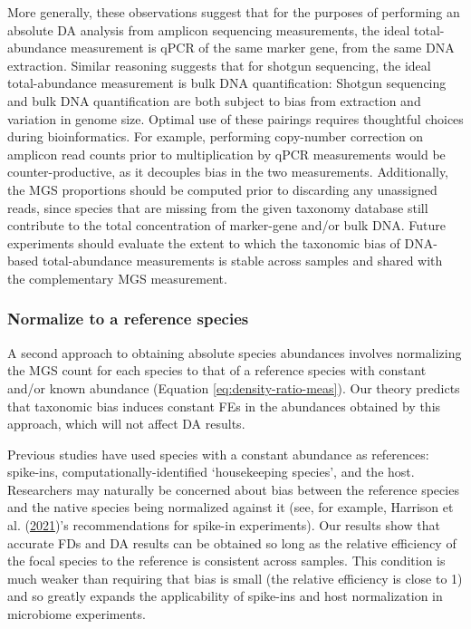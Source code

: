 \documentclass[
]{article}
\begin{document}
More generally, these observations suggest that for the purposes of performing an absolute DA analysis from amplicon sequencing measurements, the ideal total-abundance measurement is qPCR of the same marker gene, from the same DNA extraction.
Similar reasoning suggests that for shotgun sequencing, the ideal total-abundance measurement is bulk DNA quantification: Shotgun sequencing and bulk DNA quantification are both subject to bias from extraction and variation in genome size.
Optimal use of these pairings requires thoughtful choices during bioinformatics. For example, performing copy-number correction on amplicon read counts prior to multiplication by qPCR measurements would be counter-productive, as it decouples bias in the two measurements. Additionally, the MGS proportions should be computed prior to discarding any unassigned reads, since species that are missing from the given taxonomy database still contribute to the total concentration of marker-gene and/or bulk DNA.
Future experiments should evaluate the extent to which the taxonomic bias of DNA-based total-abundance measurements is stable across samples and shared with the complementary MGS measurement.

\hypertarget{normalize-to-a-reference-species}{%
\subsubsection{Normalize to a reference species}\label{normalize-to-a-reference-species}}

A second approach to obtaining absolute species abundances involves normalizing the MGS count for each species to that of a reference species with constant and/or known abundance (Equation \eqref{eq:density-ratio-meas}).
Our theory predicts that taxonomic bias induces constant FEs in the abundances obtained by this approach, which will not affect DA results.

Previous studies have used species with a constant abundance as references: spike-ins, computationally-identified `housekeeping species', and the host.
Researchers may naturally be concerned about bias between the reference species and the native species being normalized against it (see, for example, Harrison et al. (\protect\hyperlink{ref-harrison2021theq}{2021})'s recommendations for spike-in experiments).
Our results show that accurate FDs and DA results can be obtained so long as the relative efficiency of the focal species to the reference is consistent across samples.
This condition is much weaker than requiring that bias is small (the relative efficiency is close to 1) and so greatly expands the applicability of spike-ins and host normalization in microbiome experiments.
\end{document}
